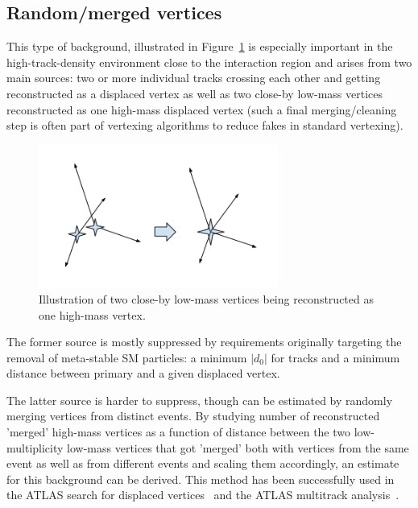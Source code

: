 \subsection{Random/merged vertices} %

This type of background, illustrated in Figure~\ref{fig:mergedvertices} is especially important in the high-track-density environment close to the interaction region and arises from two main sources: two or more individual tracks crossing each other and getting reconstructed as a displaced vertex as well as two close-by low-mass vertices reconstructed as one high-mass displaced vertex (such a final merging/cleaning step is often part of vertexing algorithms to reduce fakes in standard vertexing).

\begin{figure}[h]
  \centering
  \includegraphics[width=0.7\textwidth]{figures/mergedvertices.png}
  \caption{Illustration of two close-by low-mass vertices being reconstructed as one high-mass vertex.}
  \label{fig:mergedvertices}
\end{figure}

The former source is mostly suppressed by requirements originally targeting the removal of meta-stable SM particles: a minimum $|d_0|$ for tracks and a minimum distance between primary and a given displaced vertex.

The latter source is harder to suppress, though can be estimated by randomly merging vertices from distinct events. By studying number of reconstructed 'merged' high-mass vertices as a function of distance between the two low-multiplicity low-mass vertices that got 'merged' both with vertices from the same event as well as from different events and scaling them accordingly, an estimate for this background can be derived. This method has been successfully used in the ATLAS search for displaced vertices~\cite{Aaboud:2017iio} and the ATLAS multitrack analysis~\cite{Aad:2015rba}.

